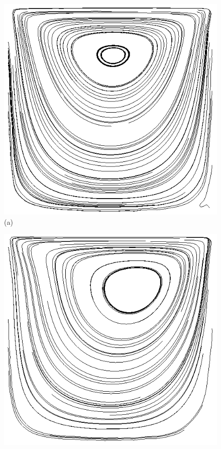 \begin{figure}[H]
     \centering
     \begin{minipage}{.45\linewidth}
      \centering
      \includegraphics[scale=0.3]{./02_chaps/cap_validation/figure/Re_10_stream_countours.png}\\
      (a)
     \end{minipage}%
     \begin{minipage}{.45\linewidth}
      \centering
      \includegraphics[scale=0.3]{./02_chaps/cap_validation/figure/Re_100_stream_countours.png}\\

\end{minipage}
\end{figure}
